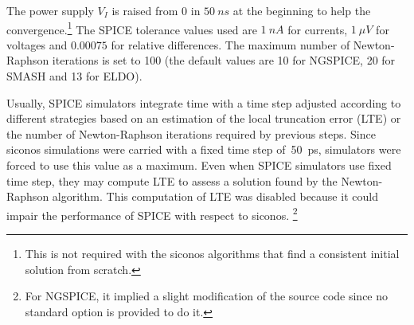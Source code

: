 The power supply $V_I$ is raised from 0 in $50~ns$ at the beginning to help the convergence.\footnote{This is
not required with the {\sc siconos} algorithms that find a consistent initial solution from scratch.}
The SPICE tolerance values used are $1~nA$ for currents, $1~\mu V$ for voltages and $0.00075$ for relative differences.
The maximum number of Newton-Raphson iterations is set to 100 (the default values are 10 for NGSPICE, 20 for SMASH and
13 for ELDO).

Usually, SPICE simulators integrate time with a time step adjusted according to different strategies based on an estimation
of the local truncation error (LTE) or the number of Newton-Raphson iterations required by previous steps.
Since {\sc siconos} simulations were carried with a fixed time step of~50~ps, simulators were forced to use this value as a maximum.
Even when SPICE simulators use fixed time step, they may compute LTE to assess a solution found by the Newton-Raphson
algorithm. This computation of LTE was disabled because it could impair the performance of SPICE with respect to {\sc siconos}.
\footnote{For NGSPICE, it implied a slight modification of the source code since no standard option is provided to do it.}

